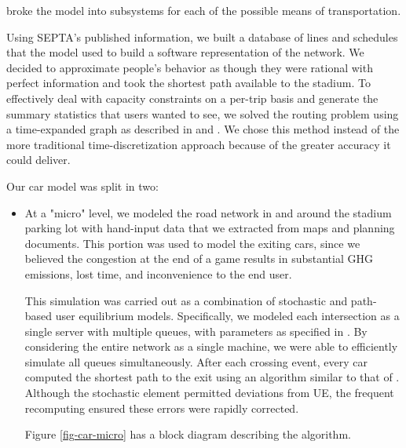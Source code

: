 \begin{description}[style=nextline]
  broke the model into subsystems for each of the possible means
  of transportation.
    \begin{description}[style=nextline]
        \item[SEPTA] Using SEPTA's published information, we built a
      database of lines and schedules that the model used to build
      a software representation of the network. We decided to
      approximate people's behavior as though they were rational with
      perfect information and took the shortest path available to the
      stadium. To effectively deal with capacity constraints on a
      per-trip basis and generate the summary statistics that users
      wanted to see, we solved the routing problem using a
      time-expanded graph as described in \cite{george2008time} and
      \cite{schulz2000dijkstra}. We chose this method instead of the
      more traditional time-discretization approach because of the
      greater accuracy it could deliver.
        \item[Cars] Our car model was split in two: \label{cars}
      \begin{itemize}
          \item At a "micro" level, we modeled the road network in and
        around the stadium parking lot with hand-input data that we
        extracted from maps and planning documents. This portion was
        used to model the exiting cars, since we believed the
        congestion at the end of a game results in substantial GHG
        emissions, lost time, and inconvenience to the end user.

        This simulation was carried out as a combination of stochastic
        and path-based user equilibrium models. Specifically, we
        modeled each intersection as a single server with multiple
        queues, with parameters as specified in
        \cite{akccelik1991travel}. By considering the entire network
        as a single machine, we were able to efficiently simulate all
        queues simultaneously. After each crossing event, every car
        computed the shortest path to the exit using an algorithm
        similar to that of \cite{nie2010class}. Although the
        stochastic element permitted deviations from UE, the frequent
        recomputing ensured these errors were rapidly corrected.

        Figure \ref{fig-car-micro} has a block diagram describing the
        algorithm.


\end{itemize}
\end{description}
\end{description}
